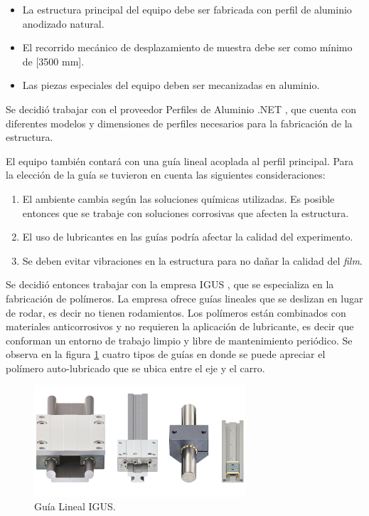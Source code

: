 \begin{itemize}
\item La estructura principal del equipo debe ser fabricada con perfil de aluminio anodizado natural.
\item El recorrido mecánico de desplazamiento de muestra debe ser como mínimo de [3500 mm].
\item Las piezas especiales del equipo deben ser mecanizadas en aluminio.

\end{itemize}

Se decidió trabajar con el proveedor Perfiles de Aluminio .NET \citep{web_perfiles_net}, que cuenta con diferentes modelos y dimensiones de perfiles necesarios para la fabricación de la estructura.

El equipo también contará con una guía lineal acoplada al perfil principal. Para la elección de la guía se tuvieron en cuenta las siguientes consideraciones:

\begin{enumerate}
\item El ambiente cambia  según las soluciones químicas utilizadas. Es posible entonces que se trabaje con soluciones corrosivas que afecten la estructura.  
\item El uso de lubricantes en las guías podría afectar la calidad del experimento.
\item Se deben evitar vibraciones en la estructura para no dañar la calidad del \textit{film}.

\end{enumerate}

Se decidió entonces trabajar con la empresa IGUS \citep{web_igus}, que se especializa en la fabricación de polímeros. La empresa ofrece guías lineales que se deslizan en lugar de rodar, es decir no tienen rodamientos. Los polímeros están combinados con materiales anticorrosivos y no requieren la aplicación de lubricante, es decir que conforman un entorno de trabajo limpio y libre de mantenimiento periódico. Se observa en la figura \ref{fig:equipo_mecánico} cuatro tipos de guías en donde se puede apreciar el polímero auto-lubricado que se ubica entre el eje y el carro.

\begin{figure}[ht]
\centering 
\includegraphics[width=0.7\textwidth]{./Figures/guias.png}
\caption{Guía Lineal IGUS.}
\label{fig:equipo_mecánico}
\end{figure}

